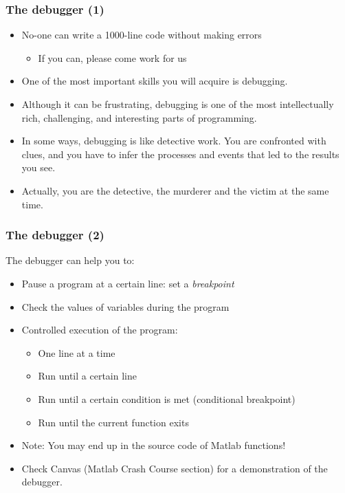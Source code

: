 \begin{frame}
\frametitle{The debugger (1)}
\begin{itemize}
   \item No-one can write a 1000-line code without making errors
  \begin{itemize}
     \item If you can, please come work for us
  \end{itemize}
   \item One of the most important skills you will acquire is debugging.
   \item Although it can be frustrating, debugging is one of the most intellectually rich, challenging, and interesting parts of programming.
   \item In some ways, debugging is like detective work. You are confronted with clues, and you have to infer the processes and events that led to the results you see.
   \item Actually, you are the detective, the murderer and the victim at the same time.
\end{itemize}
\end{frame}

\begin{frame}
  \frametitle{The debugger (2)}
The debugger can help you to:
\begin{itemize}
  \item Pause a program at a certain line: set a \emph{breakpoint}
  \item Check the values of variables during the program
  \item Controlled execution of the program:
  \begin{itemize}
    \item One line at a time
    \item Run until a certain line
    \item Run until a certain condition is met (conditional breakpoint)
    \item Run until the current function exits
  \end{itemize}
  \item Note: You may end up in the source code of Matlab functions!
  \item Check Canvas (Matlab Crash Course section) for a demonstration of the debugger.
\end{itemize}
\end{frame}

